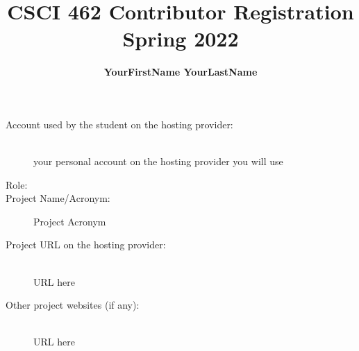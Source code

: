 \documentclass[runningheads]{llncs}
\begin{document}
%
\title{CSCI 462 Contributor Registration\\Spring 2022}
%
\author{\textbf{YourFirstName YourLastName}} %
%
%
%
\maketitle
%
\begin{description}
  \item[Account used by the student on the hosting provider:]\mbox{}\\
    your personal account on the hosting provider you will use
  \item[Role:] %
  \item[Project Name/Acronym:] Project Acronym %
\end{description}
\begin{description}
  \item[Project URL on the hosting provider:]\mbox{}\\
      URL here %
  \item[Other project websites (if any):]\mbox{}\\
      URL here
\end{description}
\end{document}
